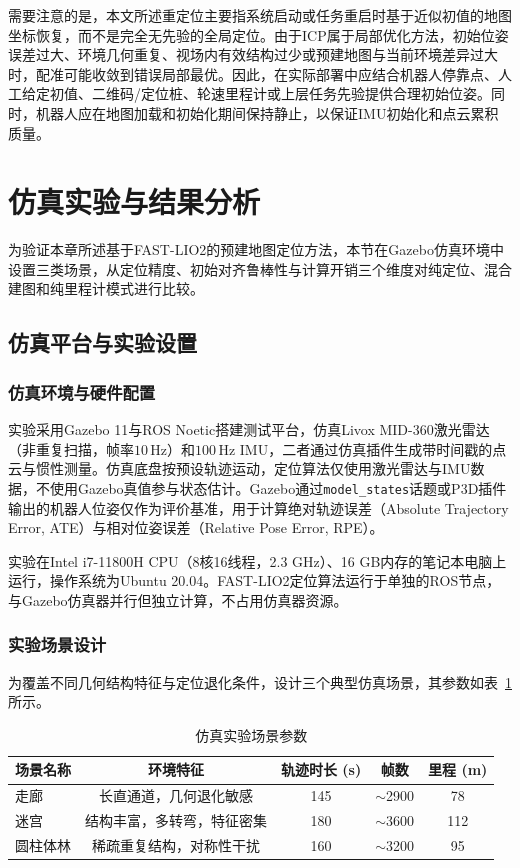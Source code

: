 需要注意的是，本文所述重定位主要指系统启动或任务重启时基于近似初值的地图坐标恢复，而不是完全无先验的全局定位。由于ICP属于局部优化方法，初始位姿误差过大、环境几何重复、视场内有效结构过少或预建地图与当前环境差异过大时，配准可能收敛到错误局部最优。因此，在实际部署中应结合机器人停靠点、人工给定初值、二维码/定位桩、轮速里程计或上层任务先验提供合理初始位姿。同时，机器人应在地图加载和初始化期间保持静止，以保证IMU初始化和点云累积质量。
\section{仿真实验与结果分析}
为验证本章所述基于FAST-LIO2的预建地图定位方法，本节在Gazebo仿真环境中设置三类场景，从定位精度、初始对齐鲁棒性与计算开销三个维度对纯定位、混合建图和纯里程计模式进行比较。

\subsection{仿真平台与实验设置}
\subsubsection{仿真环境与硬件配置}
实验采用Gazebo 11与ROS Noetic搭建测试平台，仿真Livox MID-360激光雷达（非重复扫描，帧率$10\,\mathrm{Hz}$）和$100\,\mathrm{Hz}$ IMU，二者通过仿真插件生成带时间戳的点云与惯性测量。仿真底盘按预设轨迹运动，定位算法仅使用激光雷达与IMU数据，不使用Gazebo真值参与状态估计。Gazebo通过\texttt{model\_states}话题或P3D插件输出的机器人位姿仅作为评价基准，用于计算绝对轨迹误差（Absolute Trajectory Error, ATE）与相对位姿误差（Relative Pose Error, RPE）。

实验在Intel i7-11800H CPU（8核16线程，2.3 GHz）、16 GB内存的笔记本电脑上运行，操作系统为Ubuntu 20.04。FAST-LIO2定位算法运行于单独的ROS节点，与Gazebo仿真器并行但独立计算，不占用仿真器资源。

\subsubsection{实验场景设计}
为覆盖不同几何结构特征与定位退化条件，设计三个典型仿真场景，其参数如表~\ref{tab:exp_scenarios}所示。

\begin{table}[htbp]
\centering
\caption{仿真实验场景参数}
\label{tab:exp_scenarios}
\begin{tabular}{lcccc}
\toprule
\textbf{场景名称} & \textbf{环境特征} & \textbf{轨迹时长 (s)} & \textbf{帧数} & \textbf{里程 (m)} \\
\midrule
走廊          & 长直通道，几何退化敏感            & 145   & $\sim$2900  & 78  \\
迷宫          & 结构丰富，多转弯，特征密集        & 180   & $\sim$3600  & 112 \\
圆柱体林      & 稀疏重复结构，对称性干扰          & 160   & $\sim$3200  & 95  \\
\bottomrule
\end{tabular}
\end{table}

